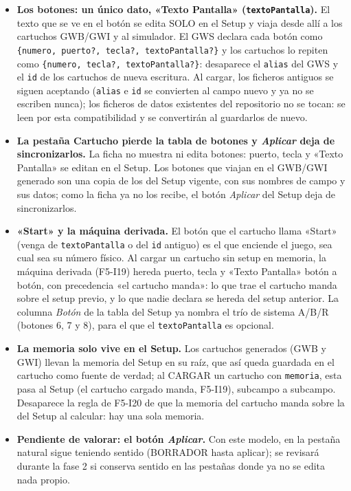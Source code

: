 \begin{itemize}
	\item \textbf{Los botones: un único dato, «Texto Pantalla» (\texttt{textoPantalla}).} El texto que se ve en el botón se edita SOLO en el Setup y viaja desde allí a los cartuchos GWB/GWI y al simulador. El GWS declara cada botón como \texttt{\{numero, puerto?, tecla?, textoPantalla?\}} y los cartuchos lo repiten como \texttt{\{numero, tecla?, textoPantalla?\}}: desaparece el \texttt{alias} del GWS y el \texttt{id} de los cartuchos de nueva escritura. Al cargar, los ficheros antiguos se siguen aceptando (\texttt{alias} e \texttt{id} se convierten al campo nuevo y ya no se escriben nunca); los ficheros de datos existentes del repositorio no se tocan: se leen por esta compatibilidad y se convertirán al guardarlos de nuevo.
	\item \textbf{La pestaña Cartucho pierde la tabla de botones y \emph{Aplicar} deja de sincronizarlos.} La ficha no muestra ni edita botones: puerto, tecla y «Texto Pantalla» se editan en el Setup. Los botones que viajan en el GWB/GWI generado son una copia de los del Setup vigente, con sus nombres de campo y sus datos; como la ficha ya no los recibe, el botón \emph{Aplicar} del Setup deja de sincronizarlos.
	\item \textbf{«Start» y la máquina derivada.} El botón que el cartucho llama «Start» (venga de \texttt{textoPantalla} o del \texttt{id} antiguo) es el que enciende el juego, sea cual sea su número físico. Al cargar un cartucho sin setup en memoria, la máquina derivada (F5-I19) hereda puerto, tecla y «Texto Pantalla» botón a botón, con precedencia «el cartucho manda»: lo que trae el cartucho manda sobre el setup previo, y lo que nadie declara se hereda del setup anterior. La columna \emph{Botón} de la tabla del Setup ya nombra el trío de sistema A/B/R (botones 6, 7 y 8), para el que el \texttt{textoPantalla} es opcional.
	\item \textbf{La memoria solo vive en el Setup.} Los cartuchos generados (GWB y GWI) llevan la memoria del Setup en su raíz, que así queda guardada en el cartucho como fuente de verdad; al CARGAR un cartucho con \texttt{memoria}, esta pasa al Setup (el cartucho cargado manda, F5-I19), subcampo a subcampo. Desaparece la regla de F5-I20 de que la memoria del cartucho manda sobre la del Setup al calcular: hay una sola memoria.
	\item \textbf{Pendiente de valorar: el botón \emph{Aplicar}.} Con este modelo, en la pestaña natural sigue teniendo sentido (BORRADOR hasta aplicar); se revisará durante la fase 2 si conserva sentido en las pestañas donde ya no se edita nada propio.
\end{itemize}

